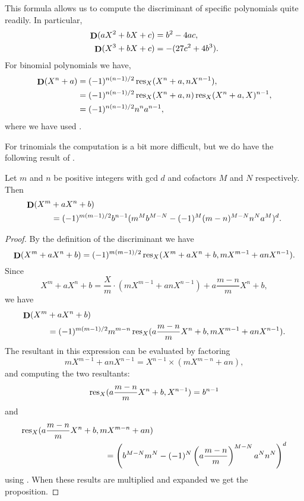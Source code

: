 This formula allows us to compute the discriminant of specific
polynomials quite readily.  In particular,
\[
\begin{aligned}
\mathop{\mathbf{D}}\nolimits(aX^2 + bX + c) & = b^2 - 4ac, \\
\mathop{\mathbf{D}}\nolimits(X^3 + bX + c)  & = -(27 c^2 + 4b^3).
\end{aligned}
\]
For binomial polynomials we have,
\[
\begin{aligned}
\mathop{\mathbf{D}}\nolimits(X^n +a) &= (-1)^{n(n-1)/2} \mathop{\rm res}\nolimits_X(X^n + a, n X^{n-1}), \\
 & = (-1)^{n(n-1)/2} \mathop{\rm res}\nolimits_X(X^n + a, n) \mathop{\rm res}\nolimits_X(X^n + a, X)^{n-1}, \\
 & = (-1)^{n(n-1)/2} n^n a^{n-1},
\end{aligned}
\]
where we have used .

For trinomials the computation is a bit more difficult, but we do have
the following result of {\Swan} \cite{Swan1962-lf}.

\begin{proposition}[Swan]
Let $m$ and $n$ be positive integers with {\sc gcd} $d$ and cofactors
$M$ and $N$ respectively.  Then
\[
\begin{aligned}
\mathop{\mathbf{D}}\nolimits(X^m & + aX^n +b)\\
  & =
 (-1)^{m(m-1)/2} b^{n-1} (m^M b^{M - N} - (-1)^M (m - n)^{M - N} n^N a^M)^d.
\end{aligned}
\]
\end{proposition}
\begin{proof}
By the definition of the discriminant we have
\[
\mathop{\mathbf{D}}\nolimits(X^m + aX^n +b) 
    = (-1)^{m(m-1)/2} \mathop{\rm res}\nolimits_X (X^m + aX^n + b, mX^{m-1} + anX^{n-1}).
\]
Since
\[
X^m + a X^n + b = \frac{X}{m} \cdot \left( mX^{m-1} + a n
X^{n-1}\right)
  + a \frac{m - n}{m} X^n + b,
\]
we have
\[
\begin{aligned}
\mathop{\mathbf{D}}\nolimits(X^m &+ aX^n +b) \\
  & = (-1)^{m(m-1)/2}  m^{m-n} \mathop{\rm res}\nolimits_X (a \frac{m - n}{m} X^n + b, mX^{m-1} + anX^{n-1}).
\end{aligned}
\]
The resultant in this expression can be evaluated by factoring
\[
mX^{m-1} + a n X^{n-1} = X^{n-1} \times (m X^{m-n} + a n),
\]
and computing the two resultants:
\[
\mathop{\rm res}\nolimits_X (a \frac{m - n}{m} X^n + b, X^{n-1}) = b^{n-1}
\]
and 
\[
\begin{aligned}
\mathop{\rm res}\nolimits_X &(a \frac{m - n}{m} X^n + b, mX^{m-n} + an)\\
  &\qquad\qquad\qquad\qquad =
\left(b^{M-N} m^N - (-1)^N \left(a \frac{m-n}{m}\right)^{M-N} a^N
n^N\right)^d
\end{aligned}
\]
using .
When these results are multiplied and expanded we get the proposition.
\end{proof}

